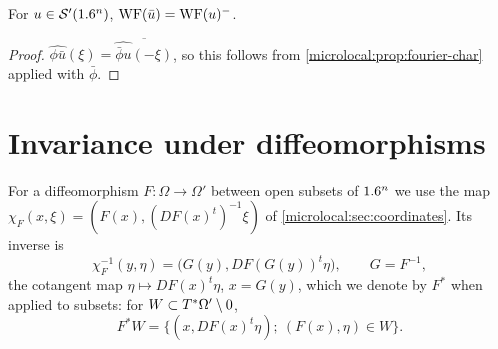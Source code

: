 \begin{corollary}\label{microlocal:cor:wf-conj}
  For $u\in\mathcal{S}'(1.6^n)$, $\operatorname{WF}(\bar u)=\operatorname{WF}(u)^-$.
\end{corollary}
\begin{proof}
  $\widehat{\phi\bar u}(\xi)=\overline{\widehat{\bar\phi u}(-\xi)}$, so this
  follows from \cref{microlocal:prop:fourier-char} applied with $\bar\phi$.
\end{proof}

\section{Invariance under diffeomorphisms}\label{microlocal:sec:diffeo}

For a diffeomorphism $F:\Omega\to\Omega'$ between open subsets of $1.6^n$ we
use the map $\chi_F(x,\xi)=(F(x),(DF(x)^t)^{-1}\xi)$ of
\cref{microlocal:sec:coordinates}. Its inverse is
\begin{equation*}
  \chi_F^{-1}(y,\eta)=\bigl(G(y),DF(G(y))^t\eta\bigr),\qquad G=F^{-1},
\end{equation*}
the cotangent map $\eta\mapsto DF(x)^t\eta$, $x=G(y)$, which we denote by
$F^*$ when applied to subsets: for $W\subset T^*\Omega'\setminus0$,
\begin{equation*}
  F^*W=\{(x,DF(x)^t\eta);\ (F(x),\eta)\in W\}.
\end{equation*}

